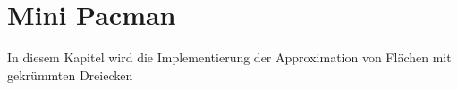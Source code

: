 \section{Mini Pacman}

 
In diesem Kapitel wird die Implementierung der Approximation von Flächen mit gekrümmten Dreiecken 





